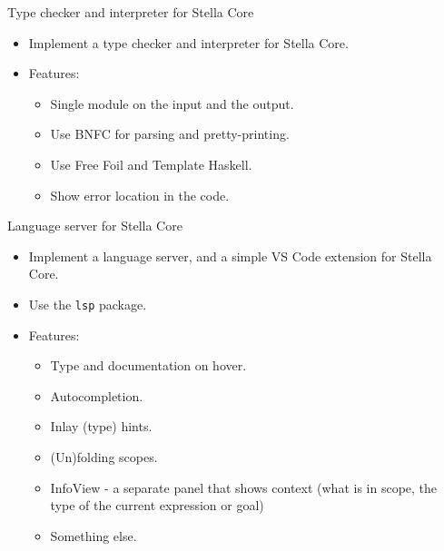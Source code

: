 \documentclass[serif, aspectratio=169]{beamer}
\begin{document}
\begin{frame}{Type checker and interpreter for Stella Core}
    \begin{itemize}
        \item Implement a type checker and interpreter for Stella Core.
        \item Features:
              \begin{itemize}
                  \item Single module on the input and the output.
                  \item Use BNFC for parsing and pretty-printing.
                  \item Use Free Foil and Template Haskell.
                  \item Show error location in the code.
              \end{itemize}
    \end{itemize}

\end{frame}

\begin{frame}{Language server for Stella Core}
    \begin{itemize}
        \item Implement a language server, and a simple VS Code extension for Stella Core.
        \item Use the \texttt{lsp} \cite{hackage_lsp} package.
        \item Features:
              \begin{itemize}
                  \item Type and documentation on hover.
                  \item Autocompletion.
                  \item Inlay (type) hints.
                  \item (Un)folding scopes.
                  \item InfoView - a separate panel that shows context (what is in scope, the type of the current expression or goal)
                  \item Something else.
              \end{itemize}
    \end{itemize}

\end{frame}


\end{document}
